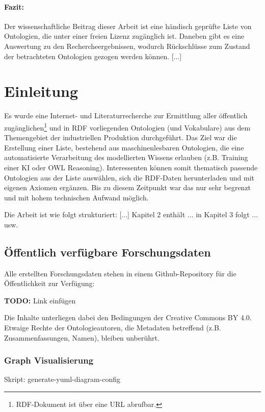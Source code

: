 \documentclass{article}
\begin{document}
\paragraph{Fazit:} Der wissenschaftliche Beitrag dieser Arbeit ist eine händisch geprüfte Liste von Ontologien, die unter einer freien Lizenz zugänglich ist. Daneben gibt es eine Auswertung zu den Rechercheergebnissen, wodurch Rückschlüsse zum Zustand der betrachteten Ontologien gezogen werden können.
[...]

\newpage

\section{Einleitung}

Es wurde eine Internet- und Literaturrecherche zur Ermittlung aller öffentlich zugänglichen\footnote{RDF-Dokument ist über eine URL abrufbar.} und in RDF vorliegenden Ontologien (und Vokabulare) aus dem Themengebiet der industriellen Produktion durchgeführt.
Das Ziel war die Erstellung einer Liste, bestehend aus maschinenlesbaren Ontologien, die eine automatisierte Verarbeitung des modellierten Wissens erlauben (z.B. Training einer KI oder OWL Reasoning).
Interessenten können somit thematisch passende Ontologien aus der Liste auswählen, sich die RDF-Daten herunterladen und mit eigenen Axiomen ergänzen.
Bis zu diesem Zeitpunkt war das nur sehr begrenzt und mit hohem technischen Aufwand möglich.

Die Arbeit ist wie folgt strukturiert: [...] Kapitel 2 enthält ... in Kapitel 3 folgt ... usw.

\subsection{Öffentlich verfügbare Forschungsdaten}

Alle erstellten Forschungsdaten stehen in einem Github-Repository für die Öffentlichkeit zur Verfügung:

\textbf{TODO:} Link einfügen

Die Inhalte unterliegen dabei den Bedingungen der Creative Commons BY 4.0.
Etwaige Rechte der Ontologieautoren, die Metadaten betreffend (z.B. Zusammenfassungen, Namen), bleiben unberührt.

\subsubsection{Graph Visualisierung}

Skript: generate-yuml-diagram-config
\end{document}
